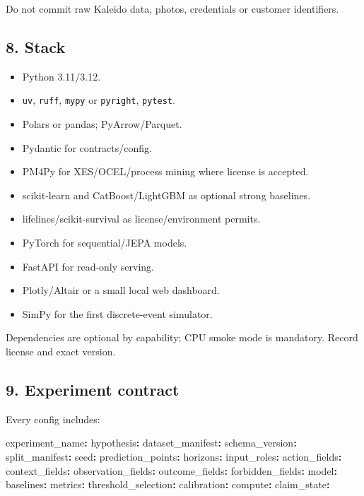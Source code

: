 \documentclass[
  spanish,
  10pt,
  a4paper,
]{article}
\newenvironment{Shaded}{}{}
\newcommand{\FunctionTok}[1]{\textcolor[rgb]{0.02,0.16,0.49}{#1}}
\newcommand{\KeywordTok}[1]{\textcolor[rgb]{0.00,0.44,0.13}{\textbf{#1}}}
\providecommand{\tightlist}{%
  \setlength{\itemsep}{0pt}\setlength{\parskip}{0pt}}
\begin{document}
Do not commit raw Kaleido data, photos, credentials or customer
identifiers.

\subsection{8. Stack}\label{8-stack}

\begin{itemize}
\tightlist
\item
  Python 3.11/3.12.
\item
  \texttt{uv}, \texttt{ruff}, \texttt{mypy} or \texttt{pyright},
  \texttt{pytest}.
\item
  Polars or pandas; PyArrow/Parquet.
\item
  Pydantic for contracts/config.
\item
  PM4Py for XES/OCEL/process mining where license is accepted.
\item
  scikit-learn and CatBoost/LightGBM as optional strong baselines.
\item
  lifelines/scikit-survival as license/environment permits.
\item
  PyTorch for sequential/JEPA models.
\item
  FastAPI for read-only serving.
\item
  Plotly/Altair or a small local web dashboard.
\item
  SimPy for the first discrete-event simulator.
\end{itemize}

Dependencies are optional by capability; CPU smoke mode is mandatory.
Record license and exact version.

\subsection{9. Experiment contract}\label{9-experiment-contract}

Every config includes:

\begin{Shaded}
\begin{Highlighting}[]
\FunctionTok{experiment\_name}\KeywordTok{:}
\FunctionTok{hypothesis}\KeywordTok{:}
\FunctionTok{dataset\_manifest}\KeywordTok{:}
\FunctionTok{schema\_version}\KeywordTok{:}
\FunctionTok{split\_manifest}\KeywordTok{:}
\FunctionTok{seed}\KeywordTok{:}
\FunctionTok{prediction\_points}\KeywordTok{:}
\FunctionTok{horizons}\KeywordTok{:}
\FunctionTok{input\_roles}\KeywordTok{:}
\FunctionTok{action\_fields}\KeywordTok{:}
\FunctionTok{context\_fields}\KeywordTok{:}
\FunctionTok{observation\_fields}\KeywordTok{:}
\FunctionTok{outcome\_fields}\KeywordTok{:}
\FunctionTok{forbidden\_fields}\KeywordTok{:}
\FunctionTok{model}\KeywordTok{:}
\FunctionTok{baselines}\KeywordTok{:}
\FunctionTok{metrics}\KeywordTok{:}
\FunctionTok{threshold\_selection}\KeywordTok{:}
\FunctionTok{calibration}\KeywordTok{:}
\FunctionTok{compute}\KeywordTok{:}
\FunctionTok{claim\_state}\KeywordTok{:}
\end{Highlighting}
\end{Shaded}
\end{document}
